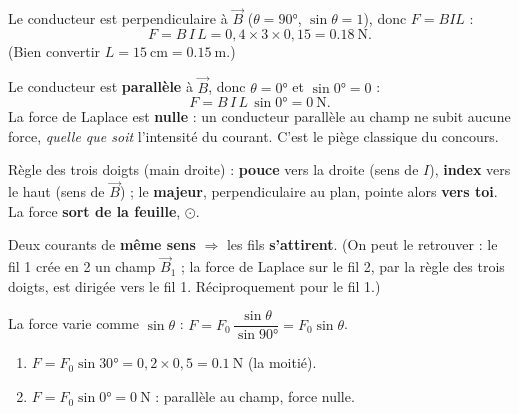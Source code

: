 \documentclass[11pt,a4paper]{article}
\newcommand{\vv}[1]{\vec{#1}}\newcommand{\ds}{\displaystyle}
\begin{document}
\begin{corrige}
Le conducteur est perpendiculaire à $\vv{B}$ ($\theta=\ang{90}$, $\sin\theta=1$), donc $F=BIL$ :
\[ F=B\,I\,L=0{,}4\times3\times0{,}15=\qty{0.18}{\newton}. \]
(Bien convertir $L=\qty{15}{\centi\metre}=\qty{0.15}{\metre}$.)
\end{corrige}

\begin{corrige}
Le conducteur est \textbf{parallèle} à $\vv{B}$, donc $\theta=\ang{0}$ et $\sin\ang{0}=0$ :
\[ F=B\,I\,L\,\sin\ang{0}=\qty{0}{\newton}. \]
La force de Laplace est \textbf{nulle} : un conducteur parallèle au champ ne subit aucune force,
\emph{quelle que soit} l'intensité du courant. C'est le piège classique du concours.
\end{corrige}

\begin{corrige}
Règle des trois doigts (main droite) : \textbf{pouce} vers la droite (sens de $I$), \textbf{index}
vers le haut (sens de $\vv{B}$) ; le \textbf{majeur}, perpendiculaire au plan, pointe alors
\textbf{vers toi}. La force \textbf{sort de la feuille}, $\odot$.
\end{corrige}

\begin{corrige}
Deux courants de \textbf{même sens} $\Rightarrow$ les fils \textbf{s'attirent}.
(On peut le retrouver : le fil 1 crée en 2 un champ $\vv{B}_1$ ; la force de Laplace sur le fil 2,
par la règle des trois doigts, est dirigée vers le fil 1. Réciproquement pour le fil 1.)
\end{corrige}

\begin{corrige}
La force varie comme $\sin\theta$ : $F=F_0\,\dfrac{\sin\theta}{\sin\ang{90}}=F_0\sin\theta$.
\begin{enumerate}[label=\alph*)]
  \item $F=F_0\sin\ang{30}=0{,}2\times0{,}5=\qty{0.1}{\newton}$ (la moitié).
  \item $F=F_0\sin\ang{0}=\qty{0}{\newton}$ : parallèle au champ, force nulle.
\end{enumerate}
\end{corrige}
\end{document}
